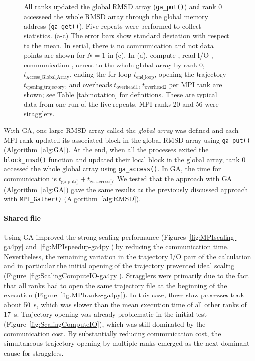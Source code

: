 \begin{figure}[!htb]
{    All ranks updated the global RMSD array (\texttt{ga\_put()}) and rank 0 accesseed the whole RMSD array through the global memory address (\texttt{ga\_get()}).
    Five repeats were performed to collect statistics. (a-c) The error bars show standard deviation with respect to the mean. 
    In serial, there is no communication and not data points are shown for $N=1$ in (c).
    In (d), compute \tcomp, read I/O \tIO, communication \tcomm, access to the whole global array by rank 0, $t_{\text{Access\_Global\_Array}}$, ending the for loop $t_{\text{end\_loop}}$,
    opening the trajectory $t_{\text{opening\_trajectory}}$, and overheads $t_{\text{overhead1}}$, $t_{\text{overhead2}}$ per MPI rank are shown; see Table \ref{tab:notation} for definitions. 
    These are typical data from one run of the five repeats.
    MPI ranks 20 and 56 were stragglers.
  }
\label{fig:MPIwithIO-ga4py}
\end{figure}

With GA, one large RMSD array called the \emph{global array} was defined and each MPI rank updated its associated block in the global RMSD array using \texttt{ga\_put()} (Algorithm~\ref{alg:GA}).
At the end, when all the processes exited the \texttt{block\_rmsd()} function and updated their local block in the global array, rank 0  accessed the whole global array using \texttt{ga\_access()}.
In GA, the time for communication is $t_{\text{ga\_put()}}+t_{\text{ga\_access()}}$. 
We tested that the approach with GA (Algorithm~\ref{alg:GA}) gave the same results as the previously discussed approach with \texttt{MPI\_Gather()} (Algorithm~\ref{alg:RMSD}).


\paragraph{Shared file}
Using GA improved the strong scaling performance (Figures~\ref{fig:MPIscaling-ga4py} and~\ref{fig:MPIspeedup-ga4py}) by reducing the communication time.
Nevertheless, the remaining variation in the trajectory I/O part of the calculation and in particular the initial opening of the trajectory prevented ideal scaling (Figure~\ref{fig:ScalingComputeIO-ga4py}).
Stragglers were primarily due to the fact that all ranks had to open the same trajectory file at the beginning of the execution (Figure~\ref{fig:MPIranks-ga4py}).
In this case, these slow processes took about 50~s, which was slower than the mean execution time of all other ranks of 17~s. 
Trajectory opening was already problematic in the initial test (Figure~\ref{fig:ScalingComputeIO}), which was still dominated by the communication cost.
By substantially reducing communication cost, the simultaneous trajectory opening by multiple ranks emerged as the next dominant cause for stragglers.


